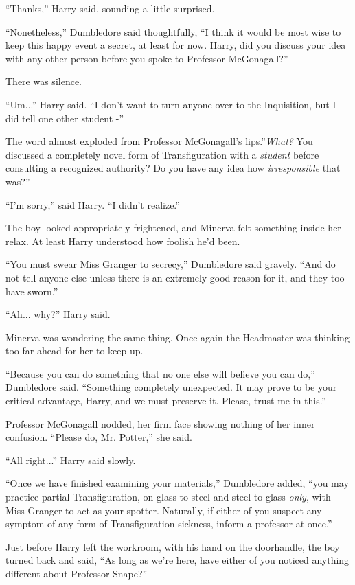 ``Thanks,'' Harry said, sounding a little surprised.

``Nonetheless,'' Dumbledore said thoughtfully, ``I think it would be
most wise to keep this happy event a secret, at least for now. Harry,
did you discuss your idea with any other person before you spoke to
Professor McGonagall?''

There was silence.

``Um...'' Harry said. ``I don't want to turn anyone over to the
Inquisition, but I did tell one other student -''

The word almost exploded from Professor McGonagall's lips.''\emph{What?}
You discussed a completely novel form of Transfiguration with a
\emph{student} before consulting a recognized authority? Do you have any
idea how \emph{irresponsible} that was?''

``I'm sorry,'' said Harry. ``I didn't realize.''

The boy looked appropriately frightened, and Minerva felt something
inside her relax. At least Harry understood how foolish he'd been.

``You must swear Miss Granger to secrecy,'' Dumbledore said gravely.
``And do not tell anyone else unless there is an extremely good reason
for it, and they too have sworn.''

``Ah... why?'' Harry said.

Minerva was wondering the same thing. Once again the Headmaster was
thinking too far ahead for her to keep up.

``Because you can do something that no one else will believe you can
do,'' Dumbledore said. ``Something completely unexpected. It may prove
to be your critical advantage, Harry, and we must preserve it. Please,
trust me in this.''

Professor McGonagall nodded, her firm face showing nothing of her inner
confusion. ``Please do, Mr. Potter,'' she said.

``All right...'' Harry said slowly.

``Once we have finished examining your materials,'' Dumbledore added,
``you may practice partial Transfiguration, on glass to steel and steel
to glass \emph{only}, with Miss Granger to act as your spotter.
Naturally, if either of you suspect any symptom of any form of
Transfiguration sickness, inform a professor at once.''

Just before Harry left the workroom, with his hand on the doorhandle,
the boy turned back and said, ``As long as we're here, have either of
you noticed anything different about Professor Snape?''

